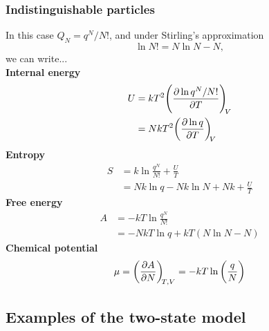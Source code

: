 \subsubsection{Indistinguishable particles}
In this case $Q_N=q^N/N!$, and under Stirling's approximation
\begin{equation}
\ln N!=N\ln N-N,
\end{equation}
we can write...\\
\textbf{Internal energy}
\begin{equation}
    \begin{aligned}
   U&=kT^2\diffp{\ln q^N/N!}{T}[V]\\
   &=NkT^2\diffp{\ln q}{T}[V]
    \end{aligned}
\end{equation}
\textbf{Entropy}
\begin{equation}
    \begin{aligned}
    S&=k\ln\frac{q^N}{N!}+\frac{U}{T}\\
    &=Nk\ln q-Nk\ln N+Nk+\frac{U}{T}
    \end{aligned}
\end{equation}
\textbf{Free energy}
\begin{equation}
    \begin{aligned}
    A&=-kT\ln\frac{q^N}{N!}\\
    &=-NkT\ln q+kT(N\ln N-N)
    \end{aligned}
\end{equation}
\textbf{Chemical potential}\\
\begin{equation}
\begin{aligned}
  \mu=\diffp AN[T,V]=-kT\ln\lf(\frac{q}{N} \rt)
\end{aligned}
\end{equation}
\subsection{Examples of the two-state model}
